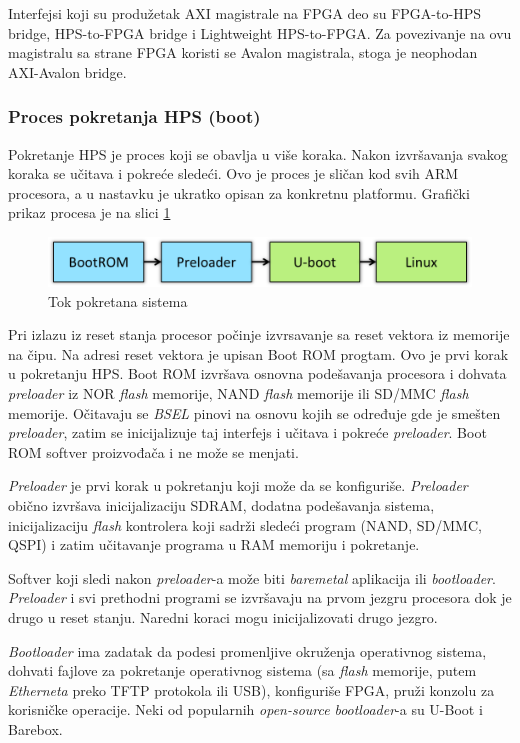Interfejsi koji su produžetak AXI magistrale na FPGA deo su FPGA-to-HPS bridge, HPS-to-FPGA bridge i Lightweight HPS-to-FPGA. Za povezivanje na ovu magistralu sa strane FPGA koristi se Avalon magistrala, stoga je neophodan AXI-Avalon bridge.

\subsubsection{Proces pokretanja HPS (boot)}
Pokretanje HPS je proces koji se obavlja u više koraka. Nakon izvršavanja svakog koraka se učitava i pokreće sledeći. Ovo je proces je sličan kod svih ARM procesora, a u nastavku je ukratko opisan za konkretnu platformu. Grafički prikaz procesa je na slici \ref{slika1:bootr}

\begin{figure}[h!]
\centering
\includegraphics[scale=1.]{img/gsrd-boot.png}
\caption{Tok pokretana sistema}
\label{slika1:bootr}
\end{figure}

Pri izlazu iz reset stanja procesor počinje izvrsavanje sa reset vektora iz memorije na čipu. Na adresi reset vektora je upisan Boot ROM progtam. Ovo je prvi korak u pokretanju HPS. Boot ROM izvršava osnovna podešavanja procesora i dohvata \textit{preloader} iz NOR \textit{flash} memorije, NAND \textit{flash} memorije ili SD/MMC \textit{flash} memorije. Očitavaju se \textit{BSEL} pinovi na osnovu kojih se određuje gde je smešten \textit{preloader}, zatim se inicijalizuje taj interfejs i učitava i pokreće \textit{preloader}. Boot ROM softver proizvođača i ne može se menjati. 

\textit{Preloader} je prvi korak u pokretanju koji može da se konfiguriše. \textit{Preloader} obično izvršava inicijalizaciju SDRAM, dodatna podešavanja sistema, inicijalizaciju \textit{flash} kontrolera koji sadrži sledeći program (NAND, SD/MMC, QSPI) i zatim učitavanje programa u RAM memoriju i pokretanje.

Softver koji sledi nakon \textit{preloader}-a može biti \textit{baremetal} aplikacija ili \textit{bootloader}. \textit{Preloader} i svi prethodni programi se izvršavaju na prvom jezgru procesora dok je drugo u reset stanju. Naredni koraci mogu inicijalizovati drugo jezgro.

\textit{Bootloader} ima zadatak da podesi promenljive okruženja operativnog sistema, dohvati fajlove za pokretanje operativnog sistema (sa \textit{flash} memorije, putem \textit{Etherneta} preko TFTP protokola ili USB), konfiguriše FPGA, pruži konzolu za korisničke operacije. Neki od popularnih \textit{open-source} \textit{bootloader}-a su U-Boot i Barebox.

